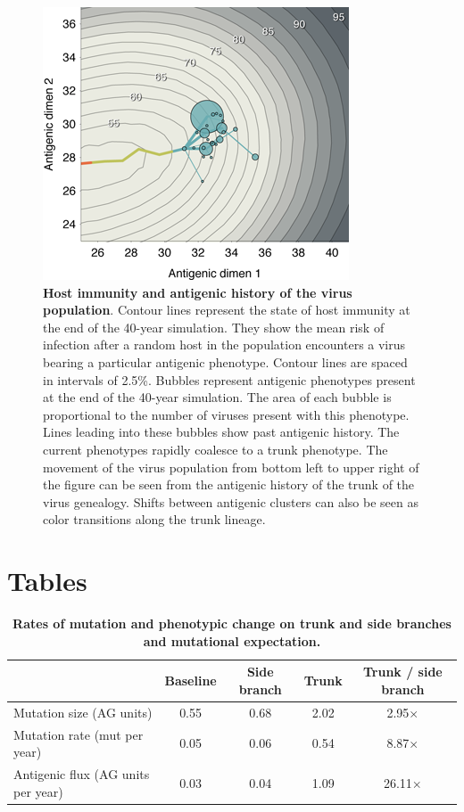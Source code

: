 \documentclass[11pt,oneside,letterpaper]{article}
\begin{document}
\begin{figure}[H]
	\centering
	\includegraphics{figures/immunity}
	\caption{\textbf{Host immunity and antigenic history of the virus population}.  Contour lines represent the state of host immunity at the end of the 40-year simulation.  They show the mean risk of infection after a random host in the population encounters a virus bearing a particular antigenic phenotype.  Contour lines are spaced in intervals of 2.5\%. Bubbles represent antigenic phenotypes present at the end of the 40-year simulation.  The area of each bubble is proportional to the number of viruses present with this phenotype.  Lines leading into these bubbles show past antigenic history.  The current phenotypes rapidly coalesce to a trunk phenotype.  The movement of the virus population from bottom left to upper right of the figure can be seen from the antigenic history of the trunk of the virus genealogy. Shifts between antigenic clusters can also be seen as color transitions along the trunk lineage.}
	\label{immunity}
\end{figure}

\section*{Tables}


\begin{table}[H]
	\centering
	\caption{\textbf{Rates of mutation and phenotypic change on trunk and side branches and mutational expectation.}}
	\label{mktable}
	\begin{tabular}{ l c c c c } 
	\hline
		 								& Baseline 	& Side branch 	& Trunk		& Trunk / side branch \\
	\hline				
	Mutation size (AG units)			& 0.55		& 0.68			& 2.02		& 2.95$\times$ \\
	Mutation rate (mut per year)		& 0.05		& 0.06			& 0.54		& 8.87$\times$ \\	
	Antigenic flux (AG units per year)	& 0.03		& 0.04			& 1.09		& 26.11$\times$ \\		
	\hline
	\end{tabular}
\end{table}
\end{document}

